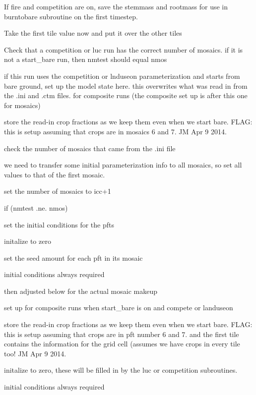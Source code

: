 If fire and competition are on, save the stemmass and rootmass for use in burntobare subroutine on the first timestep.

Take the first tile value now and put it over the other tiles

Check that a competition or luc run has the correct number of mosaics. if it is not a start\+\_\+bare run, then nmtest should equal nmos

if this run uses the competition or lnduseon parameterization and starts from bare ground, set up the model state here. this overwrites what was read in from the .ini and .ctm files. for composite runs (the composite set up is after this one for mosaics)

store the read-\/in crop fractions as we keep them even when we start bare. F\+L\+A\+G\+: this is setup assuming that crops are in mosaics 6 and 7. J\+M Apr 9 2014.

check the number of mosaics that came from the .ini file

we need to transfer some initial parameterization info to all mosaics, so set all values to that of the first mosaic.

set the number of mosaics to icc+1

if (nmtest .ne. nmos)

set the initial conditions for the pfts

initalize to zero

set the seed amount for each pft in its mosaic

initial conditions always required

then adjusted below for the actual mosaic makeup

set up for composite runs when start\+\_\+bare is on and compete or landuseon

store the read-\/in crop fractions as we keep them even when we start bare. F\+L\+A\+G\+: this is setup assuming that crops are in pft number 6 and 7. and the first tile contains the information for the grid cell (assumes we have crops in every tile too! J\+M Apr 9 2014.

initalize to zero, these will be filled in by the luc or competition subroutines.

initial conditions always required 
